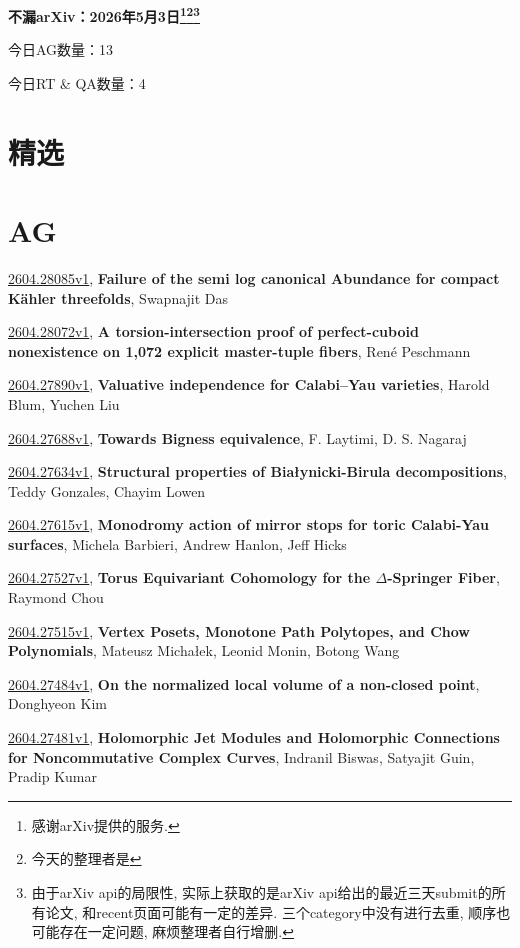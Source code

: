 \documentclass[9pt, a4paper]{article}
\theoremstyle{plain}
\theoremstyle{definition}
\theoremstyle{remark}
\newcommand{\arxiv}[3]{\href{https://arxiv.org/abs/#1}{#1}, \textbf{\textcolor{arxivblue}{#2}}, #3}
\newcommand{\AGnumber}{13}
\newcommand{\RTQAnumber}{4}
\newcommand{\NewestDate}{2026年5月3日}
\newcommand{\todayarXiver}{} %
\begin{document}
\begin{center}
    \Huge\textbf{不漏arXiv：\NewestDate\footnote{感谢arXiv提供的服务.}\footnote{今天的整理者是\todayarXiver}\footnote{由于arXiv api的局限性, 实际上获取的是arXiv api给出的最近三天submit的所有论文, 和recent页面可能有一定的差异. 三个category中没有进行去重, 顺序也可能存在一定问题, 麻烦整理者自行增删.}} \\
\end{center}

\setcounter{section}{-1}

\begin{center}
    今日AG数量：\AGnumber
    
    今日RT \& QA数量：\RTQAnumber
    
\end{center}


\section{精选}


\section{AG}
\arxiv{2604.28085v1}{Failure of the semi log canonical Abundance for compact Kähler threefolds}{Swapnajit Das}

\arxiv{2604.28072v1}{A torsion-intersection proof of perfect-cuboid nonexistence on 1,072 explicit master-tuple fibers}{René Peschmann}

\arxiv{2604.27890v1}{Valuative independence for Calabi--Yau varieties}{Harold Blum, Yuchen Liu}

\arxiv{2604.27688v1}{Towards Bigness equivalence}{F. Laytimi, D. S. Nagaraj}

\arxiv{2604.27634v1}{Structural properties of Białynicki-Birula decompositions}{Teddy Gonzales, Chayim Lowen}

\arxiv{2604.27615v1}{Monodromy action of mirror stops for toric Calabi-Yau surfaces}{Michela Barbieri, Andrew Hanlon, Jeff Hicks}

\arxiv{2604.27527v1}{Torus Equivariant Cohomology for the $Δ$-Springer Fiber}{Raymond Chou}

\arxiv{2604.27515v1}{Vertex Posets, Monotone Path Polytopes, and Chow Polynomials}{Mateusz Michałek, Leonid Monin, Botong Wang}

\arxiv{2604.27484v1}{On the normalized local volume of a non-closed point}{Donghyeon Kim}

\arxiv{2604.27481v1}{Holomorphic Jet Modules and Holomorphic Connections for Noncommutative Complex Curves}{Indranil Biswas, Satyajit Guin, Pradip Kumar}
\end{document}
